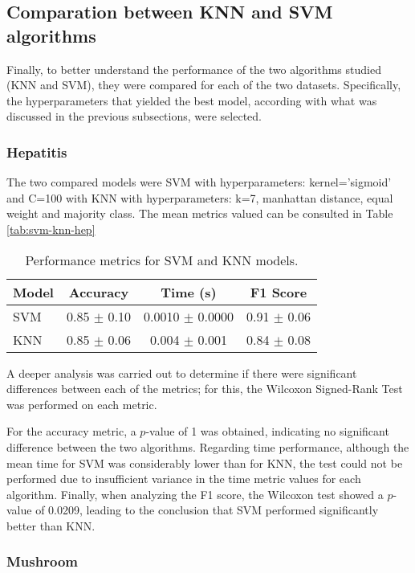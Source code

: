 \subsection{Comparation between KNN and SVM algorithms}
Finally, to better understand the performance of the two algorithms studied (KNN and SVM), they were compared for each of the two datasets. Specifically, the hyperparameters that yielded the best model, according with what was discussed in the previous subsections, were selected.
\subsubsection{Hepatitis}

The two compared models were SVM with hyperparameters: kernel='sigmoid' and C=100 with KNN with hyperparameters: k=7, manhattan distance, equal weight and majority class. The mean metrics valued can be consulted in Table \ref{tab:svm-knn-hep} \newline

\begin{table}[h!]
\centering
\begin{tabular}{lccc}
\hline
\textbf{Model} & \textbf{Accuracy} & \textbf{Time (s)} & \textbf{F1 Score} \\
\hline
SVM & 0.85 $\pm$ 0.10 & 0.0010 $\pm$ 0.0000 & 0.91 $\pm$ 0.06 \\
\hline
KNN & 0.85 $\pm$ 0.06 & 0.004 $\pm$ 0.001 & 0.84 $\pm$ 0.08 \\
\hline
\end{tabular}
\caption{Performance metrics for SVM and KNN models.}
\label{tabsvm-knn-hep}
\end{table}

A deeper analysis was carried out to determine if there were significant differences between each of the metrics; for this, the Wilcoxon Signed-Rank Test was performed on each metric. \newline

For the accuracy metric, a $p$-value of 1 was obtained, indicating no significant difference between the two algorithms. Regarding time performance, although the mean time for SVM was considerably lower than for KNN, the test could not be performed due to insufficient variance in the time metric values for each algorithm. Finally, when analyzing the F1 score, the Wilcoxon test showed a $p$-value of 0.0209, leading to the conclusion that SVM performed significantly better than KNN.
\subsubsection{Mushroom}

